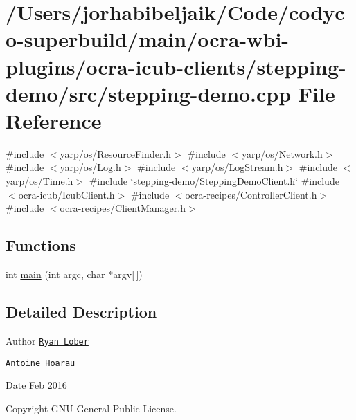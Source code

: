 \hypertarget{stepping-demo_8cpp}{}\section{/\+Users/jorhabibeljaik/\+Code/codyco-\/superbuild/main/ocra-\/wbi-\/plugins/ocra-\/icub-\/clients/stepping-\/demo/src/stepping-\/demo.cpp File Reference}
\label{stepping-demo_8cpp}
{\ttfamily \#include $<$yarp/os/\+Resource\+Finder.\+h$>$}\newline
{\ttfamily \#include $<$yarp/os/\+Network.\+h$>$}\newline
{\ttfamily \#include $<$yarp/os/\+Log.\+h$>$}\newline
{\ttfamily \#include $<$yarp/os/\+Log\+Stream.\+h$>$}\newline
{\ttfamily \#include $<$yarp/os/\+Time.\+h$>$}\newline
{\ttfamily \#include \char`\"{}stepping-\/demo/\+Stepping\+Demo\+Client.\+h\char`\"{}}\newline
{\ttfamily \#include $<$ocra-\/icub/\+Icub\+Client.\+h$>$}\newline
{\ttfamily \#include $<$ocra-\/recipes/\+Controller\+Client.\+h$>$}\newline
{\ttfamily \#include $<$ocra-\/recipes/\+Client\+Manager.\+h$>$}\newline
\subsection*{Functions}
\begin{DoxyCompactItemize}
\item 
int \hyperlink{stepping-demo_8cpp_a0ddf1224851353fc92bfbff6f499fa97}{main} (int argc, char $\ast$argv\mbox{[}$\,$\mbox{]})
\end{DoxyCompactItemize}


\subsection{Detailed Description}
\begin{DoxyAuthor}{Author}
\href{http://www.ryanlober.com}{\tt Ryan Lober} 

\href{http://ahoarau.github.io}{\tt Antoine Hoarau} 
\end{DoxyAuthor}
\begin{DoxyDate}{Date}
Feb 2016 
\end{DoxyDate}
\begin{DoxyCopyright}{Copyright}
G\+NU General Public License. 
\end{DoxyCopyright}


